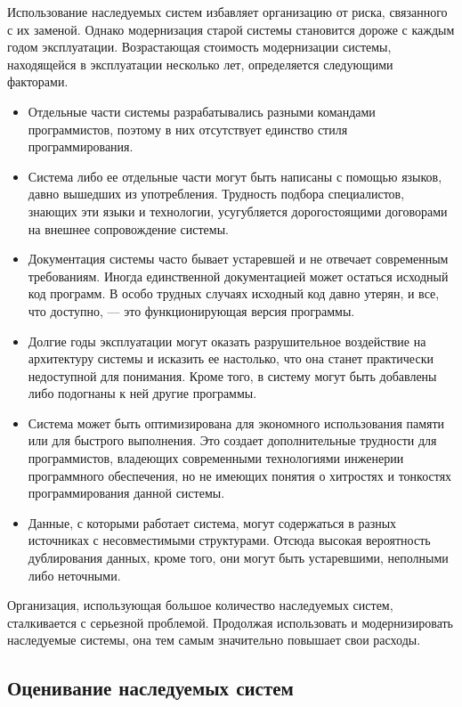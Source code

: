 \documentclass{../../text-style}
\begin{document}
Использование наследуемых систем избавляет организацию от риска, связанного с их заменой. Однако модернизация старой системы становится дороже с каждым годом эксплуатации. Возрастающая стоимость модернизации системы, находящейся в эксплуатации несколько лет, определяется следующими факторами.

\begin{itemize}
    \item Отдельные части системы разрабатывались разными командами программистов, поэтому в них отсутствует единство стиля программирования.
    \item Система либо ее отдельные части могут быть написаны с помощью языков, давно вышедших из употребления. Трудность подбора специалистов, знающих эти языки и технологии, усугубляется дорогостоящими договорами на внешнее сопровождение системы.
    \item Документация системы часто бывает устаревшей и не отвечает современным требованиям. Иногда единственной документацией может остаться исходный код программ. В особо трудных случаях исходный код давно утерян, и все, что доступно, --- это функционирующая версия программы.
    \item Долгие годы эксплуатации могут оказать разрушительное воздействие на архитектуру системы и исказить ее настолько, что она станет практически недоступной для понимания. Кроме того, в систему могут быть добавлены либо подогнаны к ней другие программы.
    \item Система может быть оптимизирована для экономного использования памяти или для быстрого выполнения. Это создает дополнительные трудности для программистов, владеющих современными технологиями инженерии программного обеспечения, но не имеющих понятия о хитростях и тонкостях программирования данной системы.
    \item Данные, с которыми работает система, могут содержаться в разных источниках с несовместимыми структурами. Отсюда высокая вероятность дублирования данных, кроме того, они могут быть устаревшими, неполными либо неточными.
\end{itemize}

Организация, использующая большое количество наследуемых систем, сталкивается с серьезной проблемой. Продолжая использовать и модернизировать наследуемые системы, она тем самым значительно повышает свои расходы.

\subsection{Оценивание наследуемых систем}
\end{document}
